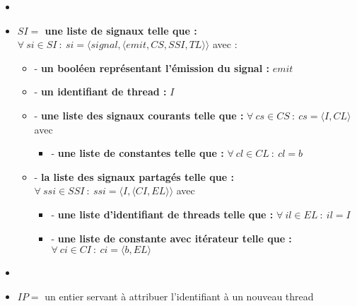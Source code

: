 \documentclass[10pt,a4paper]{article}
\begin{document}
\begin{itemize}
					\item[]
					\item[] \textbf{$SI =$ une liste de signaux telle que :} $\forall~si \in SI~:~si = \langle signal,\langle emit,CS,SSI,TL\rangle\rangle$ avec :
					\begin{itemize}
						\item[] - \textbf{un booléen représentant l'émission du signal :} $emit$
						\item[] - \textbf{un identifiant de thread :} $I$
						\item[] - \textbf{une liste des signaux courants telle que :} $\forall~cs \in CS~:~cs = \langle I,CL\rangle$ avec 
						\begin{itemize}
							\item[] - \textbf{une liste de constantes telle que :} $\forall~cl \in CL~:~cl = b$
						\end{itemize}
					
						\item[] - \textbf{la liste des signaux partagés telle que :} $\forall~ssi \in SSI~:~ssi = \langle I,\langle CI,EL\rangle\rangle$ avec 
						\begin{itemize}
							\item[] - \textbf{une liste d'identifiant de threads telle que :} $\forall~il \in EL~:~il = I$
							\item[] - \textbf{une liste de constante avec itérateur telle que :} $\forall~ci \in CI~:~ci = \langle b, EL\rangle$
						\end{itemize}
					\end{itemize}
					\item[]
					\item[] $IP =$ un entier servant à attribuer l'identifiant à un nouveau thread 
				\end{itemize}
				\bigbreak
				
\end{document}
